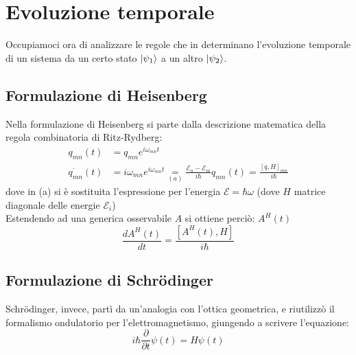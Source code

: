 \documentclass[../../FisicaTeorica.tex]{subfiles}
\begin{document}
\section{Evoluzione temporale}
Occupiamoci ora di analizzare le regole che in \MQ determinano l'evoluzione temporale di un sistema da un certo stato $\ket{\psi_1}$ a un altro $\ket{\psi_2}$.

\subsection{Formulazione di Heisenberg}
Nella formulazione di Heisenberg si parte dalla descrizione matematica della regola combinatoria di Ritz-Rydberg:
\begin{align*}
q_{mn}\left(t\right)&=q_{mn}e^{i\omega_{mn}t}\\
\dot{q_{mn}}\left(t\right)&=i\omega_{mn}e^{i\omega_{mn}t}\underset{(a)}{=}
\frac{\mathcal{E}_n-\mathcal{E}_m}{i\hbar}q_{mn}\left(t\right)=\frac{\left[q,H\right]_{mn}}{i\hbar}
\end{align*}
dove in (a) si è sostituita l'espressione per l'energia $\mathcal{E}=\hbar \omega$
(dove $H$ matrice diagonale delle energie $\mathcal{E}_i$)\\
Estendendo ad una generica osservabile $A$ si ottiene perciò:
$A^H\left(t\right)$
\[
\frac{dA^H(t)}{dt}=\frac{[A^H(t), H]}{i\hbar}
\]
\subsection{Formulazione di Schrödinger}
Schrödinger, invece, partì da un'analogia con l'ottica geometrica, e riutilizzò il formalismo ondulatorio per l'elettromagnetismo, giungendo a scrivere l'equazione:
\[
i\hbar \frac{\partial}{\partial t} \psi(t) = H\psi(t)
\]
\end{document}
